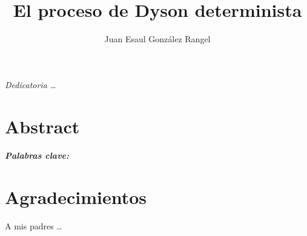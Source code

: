 \documentclass[a4paper,11pt,twoside]{book}  %
\author{Juan Esaul González Rangel}
\title{El proceso de Dyson determinista}
\begin{document}
\maketitle  %

\thispagestyle{empty}  %

\frontmatter

\chapter*{}
\begin{flushright}%
  \emph{Dedicatoria \ldots}
  \thispagestyle{empty}
\end{flushright}



\chapter*{Abstract}



\paragraph{Palabras clave:} 

\chapter*{Agradecimientos}

A mis padres \ldots

\tableofcontents


\mainmatter












%

\printbibliography[heading=bibintoc]


\backmatter
\end{document}
